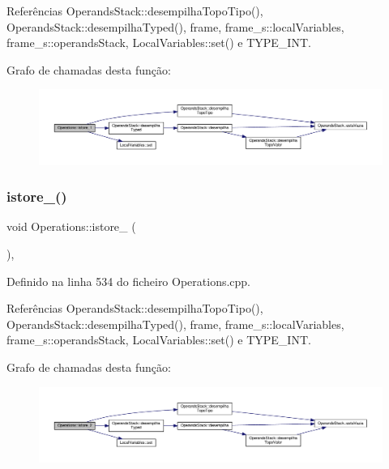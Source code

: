 Referências Operands\+Stack\+::desempilha\+Topo\+Tipo(), Operands\+Stack\+::desempilha\+Typed(), frame, frame\+\_\+s\+::local\+Variables, frame\+\_\+s\+::operands\+Stack, Local\+Variables\+::set() e T\+Y\+P\+E\+\_\+\+I\+NT.

Grafo de chamadas desta função\+:
\nopagebreak
\begin{figure}[H]
\begin{center}
\leavevmode
\includegraphics[width=350pt]{classOperations_aeb89677195b16d5c595ec9faaddc2c76_cgraph}
\end{center}
\end{figure}
\mbox{\label{classOperations_a0fbc901b4c88aef8455b30d9b2063447}} 
\subsubsection{\texorpdfstring{istore\+\_()}{istore\_2()}}
{\footnotesize\ttfamily void Operations\+::istore\+\_ (\begin{DoxyParamCaption}{ }\end{DoxyParamCaption})\hspace{0.3cm}{\ttfamily [static]}, {\ttfamily [private]}}



Definido na linha 534 do ficheiro Operations.\+cpp.



Referências Operands\+Stack\+::desempilha\+Topo\+Tipo(), Operands\+Stack\+::desempilha\+Typed(), frame, frame\+\_\+s\+::local\+Variables, frame\+\_\+s\+::operands\+Stack, Local\+Variables\+::set() e T\+Y\+P\+E\+\_\+\+I\+NT.

Grafo de chamadas desta função\+:
\nopagebreak
\begin{figure}[H]
\begin{center}
\leavevmode
\includegraphics[width=350pt]{classOperations_a0fbc901b4c88aef8455b30d9b2063447_cgraph}
\end{center}
\end{figure}
\mbox{\label{classOperations_a3ff20f0475eaaa28501ea330074f5cb7}} 
